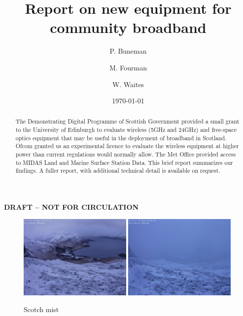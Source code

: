 \documentclass{amsart}
\title{Report on new equipment for community broadband}
\author{P. Buneman \and M. Fourman \and W. Waites}
\date{\today}
\begin{document}
\begin{center}
  {\Huge\textbf{\color{red}DRAFT -- NOT FOR CIRCULATION}}
\end{center}
\maketitle
\tableofcontents
\listoffigures

\newpage

\begin{figure}[h]
  \begin{center}
    \includegraphics[width=0.49\textwidth]{sgritheall-clear-s.jpg}%
    \hfill%
    \includegraphics[width=0.49\textwidth]{sgritheall-cloudy.jpg}
  \end{center}
\label{fig-cloudy}
\caption{Scotch mist}
\end{figure}
\begin{abstract}
The Demonstrating Digital Programme of Scottish Government provided a small grant to the
University of Edinburgh to evaluate wireless (5GHz and 24GHz) and free-space optics equipment that may be useful in the
deployment of broadband in Scotland.   Ofcom
granted us an experimental licence to evaluate the
wireless equipment at
higher
power than current regulations would normally allow. The Met Office
provided access to MIDAS Land and Marine Surface Station Data. This brief report summarizes our
findings. A fuller report, with additional technical detail is
available on request.
\end{abstract}
\end{document}
